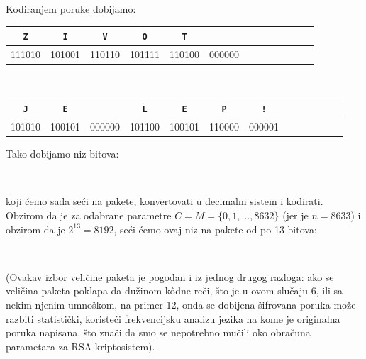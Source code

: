   Kodiranjem poruke dobijamo:
  \begin{flushleft}
    \qquad\begin{tabular}{ccccccccccccc}
      \verb`Z` & \verb`I` & \verb`V` & \verb`O` & \verb`T` & \verb*` `\\
      \hline
      111010   & 101001   & 110110   & 101111   & 110100   & 000000
    \end{tabular}
    \\
    \qquad\begin{tabular}{ccccccccccccc}
      \verb`J` & \verb`E` & \verb*` ` & \verb`L` & \verb`E` & \verb`P` & \verb`!`\\
      \hline
      101010   & 100101   & 000000    & 101100   & 100101   & 110000   & 000001    
    \end{tabular}
  \end{flushleft}
  Tako dobijamo niz bitova:
  \begin{flushleft}
    \\
  \end{flushleft}
  koji \'cemo sada se\'ci na pakete, konvertovati u decimalni sistem i kodirati. Obzirom da je za odabrane parametre
  $C = M = \{0, 1, \ldots, 8632\}$ (jer je $n = 8633$) i obzirom da je $2^{13} = 8192$, se\'ci \'cemo ovaj niz na pakete od
  po 13 bitova:
  \begin{flushleft}
      \\
          
  \end{flushleft}
  (Ovakav izbor veli\v cine paketa je pogodan i iz jednog drugog razloga: ako se veli\v cina paketa poklapa da du\v zinom
  k\^odne re\v ci, \v sto je u ovom slu\v caju 6, ili sa nekim njenim umno\v skom, na primer 12, onda se dobijena \v sifrovana
  poruka mo\v ze razbiti statisti\v cki, koriste\'ci frekvencijsku analizu jezika na kome je originalna poruka napisana, \v sto
  zna\v ci da smo se nepotrebno mu\v cili oko obra\v cuna parametara za RSA kriptosistem).
  
